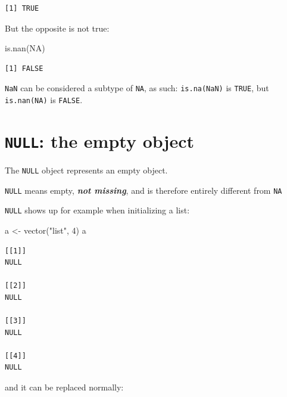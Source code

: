 \documentclass[
]{book}
\newenvironment{Shaded}{\begin{snugshade}}{\end{snugshade}}
\newcommand{\ConstantTok}[1]{\textcolor[rgb]{0.00,0.00,0.00}{#1}}
\newcommand{\DecValTok}[1]{\textcolor[rgb]{0.00,0.00,0.81}{#1}}
\newcommand{\FunctionTok}[1]{\textcolor[rgb]{0.00,0.00,0.00}{#1}}
\newcommand{\NormalTok}[1]{#1}
\newcommand{\OtherTok}[1]{\textcolor[rgb]{0.56,0.35,0.01}{#1}}
\newcommand{\StringTok}[1]{\textcolor[rgb]{0.31,0.60,0.02}{#1}}
\begin{document}
\begin{verbatim}
[1] TRUE
\end{verbatim}

But the opposite is not true:

\begin{Shaded}
\begin{Highlighting}[]
\FunctionTok{is.nan}\NormalTok{(}\ConstantTok{NA}\NormalTok{)}
\end{Highlighting}
\end{Shaded}

\begin{verbatim}
[1] FALSE
\end{verbatim}

\begin{rmdnote}
\texttt{NaN} can be considered a subtype of \texttt{NA}, as such:
\texttt{is.na(NaN)} is \texttt{TRUE}, but \texttt{is.nan(NA)} is
\texttt{FALSE}.
\end{rmdnote}

\hypertarget{null-the-empty-object}{%
\section{\texorpdfstring{\texttt{NULL}: the empty object}{NULL: the empty object}}\label{null-the-empty-object}}

The \texttt{NULL} object represents an empty object.

\begin{rmdnote}
\texttt{NULL} means empty, \textbf{\emph{not missing}}, and is therefore
entirely different from \texttt{NA}
\end{rmdnote}

\texttt{NULL} shows up for example when initializing a list:

\begin{Shaded}
\begin{Highlighting}[]
\NormalTok{a }\OtherTok{\textless{}{-}} \FunctionTok{vector}\NormalTok{(}\StringTok{"list"}\NormalTok{, }\DecValTok{4}\NormalTok{)}
\NormalTok{a}
\end{Highlighting}
\end{Shaded}

\begin{verbatim}
[[1]]
NULL

[[2]]
NULL

[[3]]
NULL

[[4]]
NULL
\end{verbatim}

and it can be replaced normally:
\end{document}
